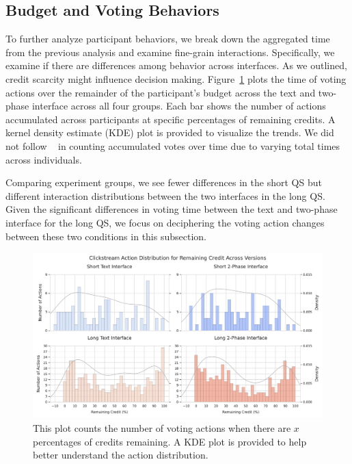 \subsection{Budget and Voting Behaviors}
To further analyze participant behaviors, we break down the aggregated time from the previous analysis and examine fine-grain interactions. Specifically, we examine if there are differences among behavior across interfaces. As we outlined, credit scarcity might influence decision making.  Figure~\ref{fig:voting_all} plots the time of voting actions over the remainder of the participant's budget across the text and two-phase interface across all four groups. Each bar shows the number of actions accumulated across participants at specific percentages of remaining credits. A kernel density estimate (KDE) plot is provided to visualize the trends. We did not follow ~\textcite{quarfoot2017quadratic} in counting accumulated votes over time due to varying total times across individuals.

Comparing experiment groups, we see fewer differences in the short QS but different interaction distributions between the two interfaces in the long QS. Given the significant differences in voting time between the text and two-phase interface for the long QS, we focus on deciphering the voting action changes between these two conditions in this subsection.

\begin{figure}[ht]
    \centering
    \includegraphics[width=\textwidth]{content/image/results/clickstream_action_distribution.pdf}
    \caption{This plot counts the number of voting actions when there are $x$ percentages of credits remaining. A KDE plot is provided to help better understand the action distribution.}
    \label{fig:voting_all}
\end{figure}

